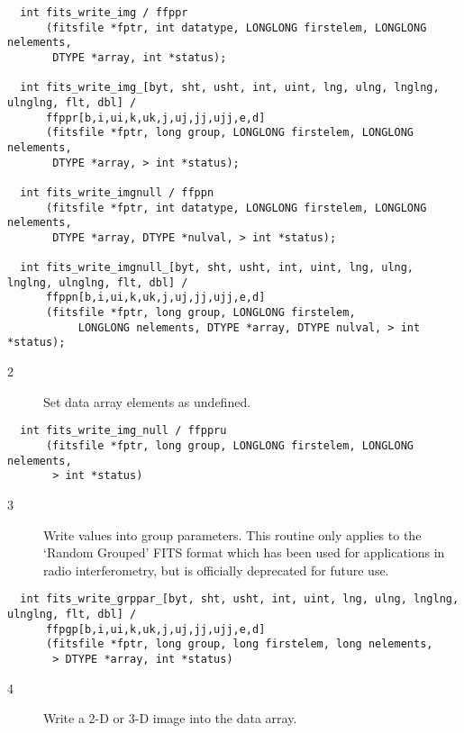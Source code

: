 \documentclass[11pt]{book}
\begin{document}
\begin{verbatim}
  int fits_write_img / ffppr
      (fitsfile *fptr, int datatype, LONGLONG firstelem, LONGLONG nelements,
       DTYPE *array, int *status);

  int fits_write_img_[byt, sht, usht, int, uint, lng, ulng, lnglng, ulnglng, flt, dbl] /
      ffppr[b,i,ui,k,uk,j,uj,jj,ujj,e,d]
      (fitsfile *fptr, long group, LONGLONG firstelem, LONGLONG nelements,
       DTYPE *array, > int *status);

  int fits_write_imgnull / ffppn
      (fitsfile *fptr, int datatype, LONGLONG firstelem, LONGLONG nelements,
       DTYPE *array, DTYPE *nulval, > int *status);

  int fits_write_imgnull_[byt, sht, usht, int, uint, lng, ulng, lnglng, ulnglng, flt, dbl] /
      ffppn[b,i,ui,k,uk,j,uj,jj,ujj,e,d]
      (fitsfile *fptr, long group, LONGLONG firstelem,
           LONGLONG nelements, DTYPE *array, DTYPE nulval, > int *status);
\end{verbatim}

\begin{description}
\item[2 ]Set data array elements as undefined. \label{ffppru}
\end{description}

\begin{verbatim}
  int fits_write_img_null / ffppru
      (fitsfile *fptr, long group, LONGLONG firstelem, LONGLONG nelements,
       > int *status)
\end{verbatim}

\begin{description}
\item[3 ] Write values into group parameters.  This routine only applies
    to the `Random Grouped' FITS format which has been used for
    applications in radio interferometry, but is officially deprecated
   for future use.  \label{ffpgpx}
\end{description}

\begin{verbatim}
  int fits_write_grppar_[byt, sht, usht, int, uint, lng, ulng, lnglng, ulnglng, flt, dbl] /
      ffpgp[b,i,ui,k,uk,j,uj,jj,ujj,e,d]
      (fitsfile *fptr, long group, long firstelem, long nelements,
       > DTYPE *array, int *status)
\end{verbatim}

\begin{description}
\item[4 ] Write a 2-D or 3-D image into the data array. \label{ffp2dx} \label{ffp3dx}
\end{description}
\end{document}
